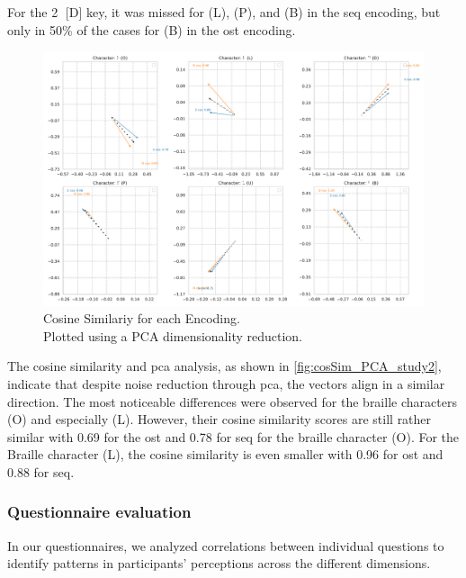 For the \textcircled{2} [D] key, it was missed for (L), (P), and (B) in the \gls{seq} encoding, but only in 50\% of the cases for (B) in the \gls{ost} encoding.

\begin{figure}
    \centering
    \includegraphics[width=\linewidth]{src/pictures/Study2Data_Experiment/Eval/vector.pdf}
    \caption{Cosine Similariy for each Encoding.\\Plotted using a PCA dimensionality reduction.}
    \label{fig:cosSim_PCA_study2}
\end{figure}

The cosine similarity and \gls{pca} analysis, as shown in \autoref{fig:cosSim_PCA_study2}, indicate that despite noise reduction through \gls{pca}, the vectors align in a similar direction. The most noticeable differences were observed for the braille characters (O) and especially (L).
However, their cosine similarity scores are still rather similar with 0.69 for the \gls{ost} and 0.78 for \gls{seq} for the braille character (O).
For the Braille character (L), the cosine similarity is even smaller with 0.96 for \gls{ost} and 0.88 for \gls{seq}.


\subsubsection{Questionnaire evaluation}
In our questionnaires, we analyzed correlations between individual questions to identify patterns in participants’ perceptions across the different dimensions.



